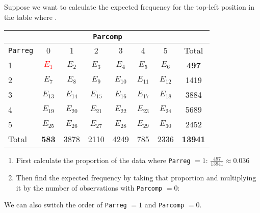 \documentclass[handout]{beamer}
\begin{document}
\begin{frame}
Suppose we want to calculate the expected frequency for the top-left
position in the table where . 
\footnotesize
\pause
\begin{table}
\begin{center}
\begin{tabular}{l|cccccc|c}
& \multicolumn{6}{c}{{\tt Parcomp}} & \\
\hline
{\tt Parreg} & 0 & 1 & 2 & 3 & 4 & 5 & Total\\
\hline
1 & \textcolor{red}{$E_1$} & $E_2$ & $E_3$ & $E_4$ &  $E_5$ & $E_6$ & \textbf{497} \\
2 & $E_7$ & $E_8$ & $E_9$ & $E_{10}$ &  $E_{11}$ & $E_{12}$ & 1419\\
3 &  $E_{13}$ & $E_{14}$ & $E_{15}$ & $E_{16}$ &  $E_{17}$ & $E_{18}$ & 3884\\
4 & $E_{19}$ & $E_{20}$ & $E_{21}$ & $E_{22}$ &  $E_{23}$ & $E_{24}$ & 5689\\
5 & $E_{25}$ & $E_{26}$ & $E_{27}$ & $E_{28}$ &  $E_{29}$ & $E_{30}$ & 2452\\
\hline
Total & \textbf{583} & 3878 & 2110 & 4249 & 785 & 2336 & \textbf{13941}\\
\end{tabular}
\end{center}
\end{table}
\normalsize
\pause
\begin{enumerate}
\item First calculate the proportion of the data where {\tt Parreg} $= 1$: \pause
$\frac{497}{13941} \approx 0.036$
\pause
\item Then find the expected frequency by taking that proportion and
multiplying it by the number of observations with {\tt Parcomp} $=0$:
\pause {} 
\pause
\end{enumerate}
\bigskip
We can also switch the order of {\tt Parreg} $=1$ and {\tt Parcomp} $=0$.
\end{frame}
\end{document}
